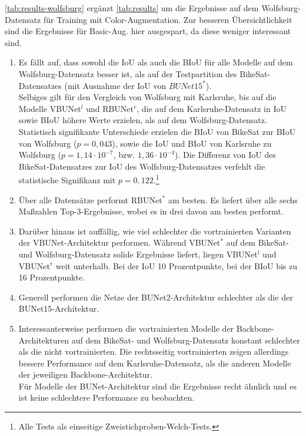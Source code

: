 \autoref{tab:results-wolfsburg} ergänzt \autoref{tab:results} um die Ergebnisse auf dem Wolfsburg-Datensatz für 
Training mit Color-Augmentation. Zur besseren Übersichtlichkeit sind die Ergebnisse für Basic-Aug. hier ausgespart, 
da diese weniger interessant sind. 
\begin{enumerate}
	\item Es fällt auf, dass sowohl die \ac{IoU} als auch die \ac{BIoU} für alle Modelle
	auf dem Wolfsburg-Datensatz besser ist, als auf der Testpartition des BikeSat-Datensatzes 
	(mit Ausnahme der IoU von $BUNet15^*$).  \\
	Selbiges gilt für den Vergleich von Wolfsburg mit Karlsruhe, bis auf die Modelle VBUNet$^l$ und 
	RBUNet$^r$, die auf dem Karlsruhe-Datensatz in IoU sowie BIoU höhere Werte erzielen, als auf dem Wolfsburg-Datensatz. \\
	Statistisch signifikante Unterschiede erzielen die BIoU von BikeSat zur BIoU von Wolfsburg ($p = 0,043$), 
	sowie die IoU und BIoU von Karlsruhe zu Wolfsburg ($p = 1,14 \cdot 10^{-7}$, bzw. $1,36 \cdot 10^{-4}$). 
	Die Differenz von IoU des BikeSat-Datensatzes zur IoU des Wolfsburg-Datensatzes verfehlt die statistische Signifikanz 
	mit $p = 0,122$.\footnote{Alle Tests als einseitige Zweistichproben-Welch-Tests.}  
	\item Über alle Datensätze performt RBUNet$^*$ am besten. Es liefert über alle sechs Maßzahlen Top-3-Ergebnisse, wobei es 
	in drei davon am besten performt. 
	\item Darüber hinaus ist auffällig, wie viel schlechter die vortrainierten Varianten der VBUNet-Architektur performen. 
	Während VBUNet$^*$ auf dem BikeSat- und Wolfsburg-Datensatz solide Ergebnisse liefert, liegen VBUNet$^l$ und VBUNet$^r$ 
	weit unterhalb. Bei der IoU 10 Prozentpunkte, bei der BIoU bis zu 16 Prozentpunkte.
	\item Generell performen die Netze der \ac{BUNet2}-Architektur schlechter als die der \ac{BUNet15}-Architektur.
	\item Interessanterweise performen die vortrainierten Modelle der Backbone-Architekturen auf dem BikeSat- und 
	Wolfsburg-Datensatz konstant schlechter als die nicht vortrainierten. Die rechtsseitig vortrainierten zeigen 
	allerdings bessere Performance auf dem Karlsruhe-Datensatz, als die anderen Modelle der jeweiligen Backbone-Architektur.\\
	Für Modelle der BUNet-Architektur sind die Ergebnisse recht ähnlich und es ist keine schlechtere Performance
	zu beobachten. 
\end{enumerate}


